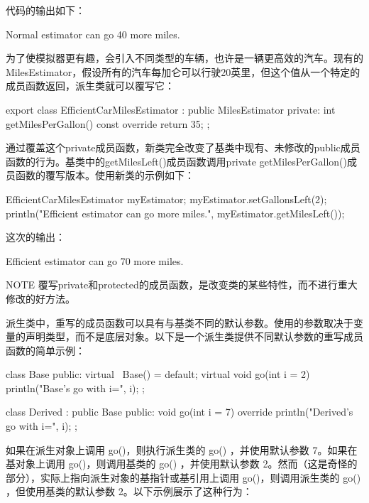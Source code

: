 代码的输出如下：

\begin{shell}
Normal estimator can go 40 more miles.
\end{shell}

为了使模拟器更有趣，会引入不同类型的车辆，也许是一辆更高效的汽车。现有的MilesEstimator，假设所有的汽车每加仑可以行驶20英里，但这个值从一个特定的成员函数返回，派生类就可以覆写它：

\begin{cpp}
export class EfficientCarMilesEstimator : public MilesEstimator
{
    private:
        int getMilesPerGallon() const override { return 35; }
};
\end{cpp}

通过覆盖这个private成员函数，新类完全改变了基类中现有、未修改的public成员函数的行为。基类中的getMilesLeft()成员函数调用private getMilesPerGallon()成员函数的覆写版本。使用新类的示例如下：

\begin{cpp}
EfficientCarMilesEstimator myEstimator;
myEstimator.setGallonsLeft(2);
println("Efficient estimator can go {} more miles.",
        myEstimator.getMilesLeft());
\end{cpp}

这次的输出：

\begin{shell}
Efficient estimator can go 70 more miles.
\end{shell}

\begin{myNotic}{NOTE}
覆写private和protected的成员函数，是改变类的某些特性，而不进行重大修改的好方法。
\end{myNotic}



派生类中，重写的成员函数可以具有与基类不同的默认参数。使用的参数取决于变量的声明类型，而不是底层对象。以下是一个派生类提供不同默认参数的重写成员函数的简单示例：

\begin{cpp}
class Base
{
    public:
        virtual ~Base() = default;
        virtual void go(int i = 2) { println("Base's go with i={}", i); }
};

class Derived : public Base
{
    public:
        void go(int i = 7) override { println("Derived's go with i={}", i); }
};
\end{cpp}

如果在派生对象上调用 go()，则执行派生类的 go() ，并使用默认参数 7。如果在基对象上调用 go()，则调用基类的 go() ，并使用默认参数 2。然而（这是奇怪的部分），实际上指向派生对象的基指针或基引用上调用 go()，则调用派生类的 go() ，但使用基类的默认参数 2。以下示例展示了这种行为：

